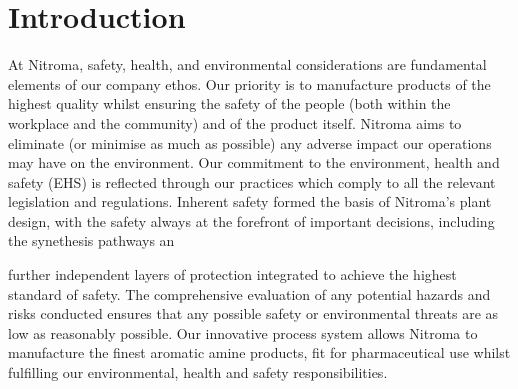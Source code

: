 \section{Introduction}

At Nitroma, safety, health, and environmental considerations are fundamental elements of our company ethos. Our priority is to manufacture products of the highest quality whilst ensuring the safety of the people (both within the workplace and the community) and of the product itself. Nitroma aims to eliminate (or minimise as much as possible) any adverse impact our operations may have on the environment. Our commitment to the environment, health and safety (EHS) is reflected through our practices which comply to all the relevant legislation and regulations. Inherent safety formed the basis of Nitroma’s plant design, with the safety always at the forefront of important decisions, including the synethesis pathways an

further independent layers of protection integrated  to achieve the highest standard of safety. The comprehensive evaluation of any potential hazards and risks conducted ensures that any possible safety or environmental threats are as low as reasonably possible. Our innovative process system allows Nitroma to manufacture the finest aromatic amine products, fit for pharmaceutical use whilst fulfilling our environmental, health and safety responsibilities.

